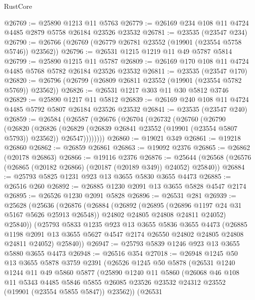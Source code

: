 \begin{lexlean}{RustCore}
\begin{coremodule}
@26769 := @25890 @1213 @11 @5763
@26779 := @26169 @234 @108 @11 @4724 @4485 @2879 @5758 @26184 @23526 @23532
@26781 := @23535 (@23547 @234)
@26790 := @26766 (@26769 (@26779 @26781 @23552 (@19901 (@23554 @5758 @5746)) @23562))
@26796 := @26531 @1215 @1219 @11 @49 @5787 @5814
@26799 := @25890 @1215 @11 @5787
@26809 := @26169 @170 @108 @11 @4724 @4485 @5768 @5782 @26184 @23526 @23532
@26811 := @23535 (@23547 @170)
@26820 := @26796 (@26799 (@26809 @26811 @23552 (@19901 (@23554 @5782 @5769)) @23562))
@26826 := @26531 @1217 @303 @11 @30 @5812 @3746
@26829 := @25890 @1217 @11 @5812
@26839 := @26169 @240 @108 @11 @4724 @4485 @5792 @5807 @26184 @23526 @23532
@26841 := @23535 (@23547 @240)
@26859 := @26584
    (@26587
      (@26676
        (@26704
          (@26732
            (@26760
              (@26790
                (@26820
                  (@26826
                    (@26829 (@26839 @26841 @23552 (@19901 (@23554 @5807 @5793)) @23562))
                    @26547))))))))
@26860 := @19021 @349
@26861 := @19218 @26860
@26862 := @26859 @26861
@26863 := @19092 @2376
@26865 := @26862 (@20178 @26863)
@26866 := @19116 @2376
@26876 := @25644 (@26568 (@26576 (@26865 (@20182 @26866) (@20187 (@20189 @349)) @24052) @25840))
@26884 := @25793 @5825 @1231 @923 @13 @3655 @5830 @3655 @4473
@26885 := @26516 @260
@26892 := @26885 @1230 @2091 @13 @3655 @5828 @4547 @2174
@26895 := @26526 @1230 @2091 @5828
@26896 := @26531 @281
@26939 := @25628
    (@25636
      (@26876
        (@26884
          (@26892
            (@26895 (@26896 @1197 @24 @31 @5167 @5626 @25913 @26548))
            @24802
            @24805
            @24808
            @24811
            @24052)
          @25840))
      (@25793
        @5833
        @1235
        @923
        @13
        @3655
        @5836
        @3655
        @4473
        (@26885 @1198 @2091 @13 @3655 @5627 @4547 @2174 @26550 @24802 @24805 @24808 @24811 @24052)
        @25840))
@26947 := @25793 @5839 @1246 @923 @13 @3655 @5880 @3655 @4473
@26948 := @26516 @354
@27018 := @26948
    @1245
    @50
    @13
    @3655
    @5878
    @3759
    @2391
    (@26526
      @1245
      @50
      @5878
      (@26531
        @1240
        @1244
        @11
        @49
        @5860
        @5877
        (@25890
          @1240
          @11
          @5860
          (@26068
            @46
            @108
            @11
            @5343
            @4485
            @5846
            @5855
            @26085
            @23526
            @23532
            @24312
            @23552
            (@19901 (@23554 @5855 @5847))
            @23562))
        (@26531

\end{coremodule}
\end{lexlean}
